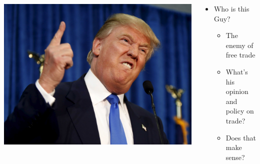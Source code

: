 \documentclass[10pt,hyperref={CJKbookmarks=true},xcolor=dvipsnames,aspectratio=169]{beamer}
\begin{document}
\begin{frame}

\begin{columns}[onlytextwidth]
	\begin{column}{0.45\textwidth}
		\includegraphics[width=\columnwidth]{fig//trump}
	\end{column}
	\begin{column}{0.55\textwidth}
		
		
		\begin{itemize}
			\item Who is this Guy?
			
			\begin{itemize}
				\item The enemy of free trade
				\item What's his opinion and policy on trade?
				\item Does that make sense?
			\end{itemize}
		\end{itemize}
	\end{column}
\end{columns}
\end{frame}
\end{document}
